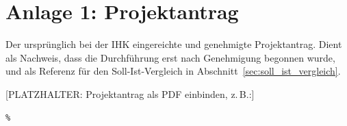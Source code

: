 \section*{Anlage 1: Projektantrag}
\label{anh:projektantrag}
Der urspr\"unglich bei der IHK eingereichte und genehmigte Projektantrag.
Dient als Nachweis, dass die Durchf\"uhrung erst nach Genehmigung begonnen
wurde, und als Referenz f\"ur den Soll-Ist-Vergleich in
Abschnitt~\ref{sec:soll_ist_vergleich}.

[PLATZHALTER: Projektantrag als PDF einbinden, z.\,B.:]
\begin{verbatim}
% 
\end{verbatim}

